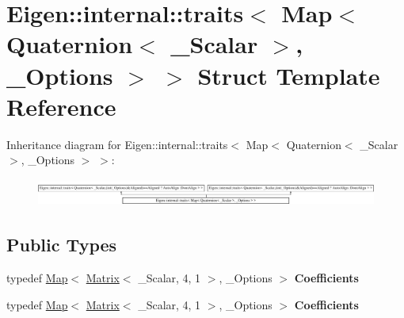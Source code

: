 \hypertarget{struct_eigen_1_1internal_1_1traits_3_01_map_3_01_quaternion_3_01___scalar_01_4_00_01___options_01_4_01_4}{}\section{Eigen\+:\+:internal\+:\+:traits$<$ Map$<$ Quaternion$<$ \+\_\+\+Scalar $>$, \+\_\+\+Options $>$ $>$ Struct Template Reference}
\label{struct_eigen_1_1internal_1_1traits_3_01_map_3_01_quaternion_3_01___scalar_01_4_00_01___options_01_4_01_4}
Inheritance diagram for Eigen\+:\+:internal\+:\+:traits$<$ Map$<$ Quaternion$<$ \+\_\+\+Scalar $>$, \+\_\+\+Options $>$ $>$\+:\begin{figure}[H]
\begin{center}
\leavevmode
\includegraphics[height=0.910569cm]{struct_eigen_1_1internal_1_1traits_3_01_map_3_01_quaternion_3_01___scalar_01_4_00_01___options_01_4_01_4}
\end{center}
\end{figure}
\subsection*{Public Types}
\begin{DoxyCompactItemize}
\item 
\mbox{\label{struct_eigen_1_1internal_1_1traits_3_01_map_3_01_quaternion_3_01___scalar_01_4_00_01___options_01_4_01_4_aa41e45edf2c262979cc05621d1a877f2}} 
typedef \hyperlink{group___core___module_class_eigen_1_1_map}{Map}$<$ \hyperlink{group___core___module_class_eigen_1_1_matrix}{Matrix}$<$ \+\_\+\+Scalar, 4, 1 $>$, \+\_\+\+Options $>$ {\bfseries Coefficients}
\item 
\mbox{\label{struct_eigen_1_1internal_1_1traits_3_01_map_3_01_quaternion_3_01___scalar_01_4_00_01___options_01_4_01_4_aa41e45edf2c262979cc05621d1a877f2}} 
typedef \hyperlink{group___core___module_class_eigen_1_1_map}{Map}$<$ \hyperlink{group___core___module_class_eigen_1_1_matrix}{Matrix}$<$ \+\_\+\+Scalar, 4, 1 $>$, \+\_\+\+Options $>$ {\bfseries Coefficients}
\end{DoxyCompactItemize}


